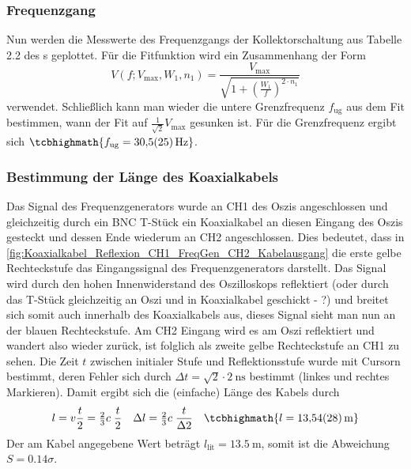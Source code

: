\subsubsection{Frequenzgang}
Nun werden die Messwerte des Frequenzgangs der Kollektorschaltung aus Tabelle 2.2 des s geplottet. Für die Fitfunktion wird ein Zusammenhang der Form
\begin{equation}
  V (f; V_\text{max}, W_1, n_1) = \frac{V_\text{max}}{\sqrt{1 + \left( \frac{W_1}{f} \right)^{2 \cdot n_1}}}
\end{equation}
verwendet. Schließlich kann man wieder die untere Grenzfrequenz \(f_\text{ug}\) aus dem Fit bestimmen, wann der Fit auf \(\frac{1}{\sqrt{2}}V_\text{max}\) gesunken ist.
\FloatBarrier
Für die Grenzfrequenz ergibt sich \(\tcbhighmath{f_\text{ug}=\qty{30.5(2.5)}{\hertz}}\).

\subsubsection{Bestimmung der Länge des Koaxialkabels}
Das Signal des Frequenzgenerators wurde an CH1 des Oszis angeschlossen und gleichzeitig durch ein BNC T-Stück ein Koaxialkabel an diesen Eingang des Oszis gesteckt und dessen Ende wiederum an CH2 angeschlossen. Dies bedeutet, dass in \cref{fig:Koaxialkabel_Reflexion_CH1_FreqGen_CH2_Kabelausgang} die erste gelbe Rechteckstufe das Eingangssignal des Frequenzgenerators darstellt. Das Signal wird durch den hohen Innenwiderstand des Oszilloskops reflektiert (oder durch das T-Stück gleichzeitig an Oszi und in Koaxialkabel geschickt - ?) und breitet sich somit auch innerhalb des Koaxialkabels aus, dieses Signal sieht man nun an der blauen Rechteckstufe. Am CH2 Eingang wird es am Oszi reflektiert und wandert also wieder zurück, ist folglich als zweite gelbe Rechteckstufe an CH1 zu sehen. Die Zeit \(t\) zwischen initialer Stufe und Reflektionsstufe wurde mit Cursorn bestimmt, deren Fehler sich durch \(\Delta t=\sqrt{2}\cdot\qty{2}{\nano\s}\) bestimmt (linkes und rechtes Markieren). Damit ergibt sich die (einfache) Länge des Kabels durch 
\begin{align}
  l=v\frac{t}{2}=\tfrac{2}{3}c\;\frac{t}{2}&&\Delta l=\tfrac{2}{3}c\;\frac{t}{\Delta 2}&&\tcbhighmath{l=\qty{13.54(28)}{\meter}}
\end{align}
Der am Kabel angegebene Wert beträgt \(l_\text{lit}= \qty{13.5}{\meter}\), somit ist die Abweichung \(S=0.14 \sigma\).
\FloatBarrier


